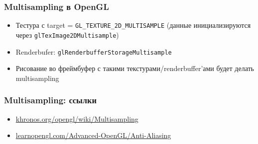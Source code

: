 \documentclass{beamer}
\begin{document}
\begin{frame}[fragile]
\frametitle{Multisampling в OpenGL}
\begin{itemize}
\item Тестура с target = \verb|GL_TEXTURE_2D_MULTISAMPLE| (данные инициализируются через \verb|glTexImage2DMultisample|)
\pause
\item Renderbufer: \verb|glRenderbufferStorageMultisample|
\pause
\item Рисование во фреймбуфер с такими текстурами/renderbuffer'ами будет делать multisampling
\end{itemize}
\end{frame}

\begin{frame}[fragile]
\frametitle{Multisampling: ссылки}
\begin{itemize}
\item \href{https://www.khronos.org/opengl/wiki/Multisampling}{khronos.org/opengl/wiki/Multisampling}
\item \href{https://learnopengl.com/Advanced-OpenGL/Anti-Aliasing}{learnopengl.com/Advanced-OpenGL/Anti-Aliasing}
\end{itemize}
\end{frame}
\end{document}
